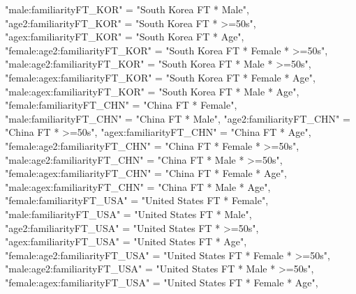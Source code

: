 \documentclass[
]{article}
\newenvironment{Shaded}{\begin{snugshade}}{\end{snugshade}}
\newcommand{\NormalTok}[1]{#1}
\newcommand{\StringTok}[1]{\textcolor[rgb]{0.31,0.60,0.02}{#1}}
\begin{document}
\begin{Shaded}
\begin{Highlighting}[]
              \StringTok{"male:familiarityFT_KOR"}\NormalTok{ =}\StringTok{ "South Korea FT * Male"}\NormalTok{,}
              \StringTok{"age2:familiarityFT_KOR"}\NormalTok{ =}\StringTok{ "South Korea FT * >=50s"}\NormalTok{,}
              \StringTok{"agex:familiarityFT_KOR"}\NormalTok{ =}\StringTok{ "South Korea FT * Age"}\NormalTok{,}
              \StringTok{"female:age2:familiarityFT_KOR"}\NormalTok{ =}\StringTok{ "South Korea FT * Female * >=50s"}\NormalTok{,}
              \StringTok{"male:age2:familiarityFT_KOR"}\NormalTok{ =}\StringTok{ "South Korea FT * Male * >=50s"}\NormalTok{,}
              \StringTok{"female:agex:familiarityFT_KOR"}\NormalTok{ =}\StringTok{ "South Korea FT * Female * Age"}\NormalTok{,}
              \StringTok{"male:agex:familiarityFT_KOR"}\NormalTok{ =}\StringTok{ "South Korea FT * Male * Age"}\NormalTok{,}
              \StringTok{"female:familiarityFT_CHN"}\NormalTok{ =}\StringTok{ "China FT * Female"}\NormalTok{,}
              \StringTok{"male:familiarityFT_CHN"}\NormalTok{ =}\StringTok{ "China FT * Male"}\NormalTok{,}
              \StringTok{"age2:familiarityFT_CHN"}\NormalTok{ =}\StringTok{ "China FT * >=50s"}\NormalTok{,}
              \StringTok{"agex:familiarityFT_CHN"}\NormalTok{ =}\StringTok{ "China FT * Age"}\NormalTok{,}
              \StringTok{"female:age2:familiarityFT_CHN"}\NormalTok{ =}\StringTok{ "China FT * Female * >=50s"}\NormalTok{,}
              \StringTok{"male:age2:familiarityFT_CHN"}\NormalTok{ =}\StringTok{ "China FT * Male * >=50s"}\NormalTok{,}
              \StringTok{"female:agex:familiarityFT_CHN"}\NormalTok{ =}\StringTok{ "China FT * Female * Age"}\NormalTok{,}
              \StringTok{"male:agex:familiarityFT_CHN"}\NormalTok{ =}\StringTok{ "China FT * Male * Age"}\NormalTok{,}
              \StringTok{"female:familiarityFT_USA"}\NormalTok{ =}\StringTok{ "United States FT * Female"}\NormalTok{,}
              \StringTok{"male:familiarityFT_USA"}\NormalTok{ =}\StringTok{ "United States FT * Male"}\NormalTok{,}
              \StringTok{"age2:familiarityFT_USA"}\NormalTok{ =}\StringTok{ "United States FT * >=50s"}\NormalTok{,}
              \StringTok{"agex:familiarityFT_USA"}\NormalTok{ =}\StringTok{ "United States FT * Age"}\NormalTok{,}
              \StringTok{"female:age2:familiarityFT_USA"}\NormalTok{ =}\StringTok{ "United States FT * Female * >=50s"}\NormalTok{,}
              \StringTok{"male:age2:familiarityFT_USA"}\NormalTok{ =}\StringTok{ "United States FT * Male * >=50s"}\NormalTok{,}
              \StringTok{"female:agex:familiarityFT_USA"}\NormalTok{ =}\StringTok{ "United States FT * Female * Age"}\NormalTok{,}

\end{Highlighting}
\end{Shaded}
\end{document}
